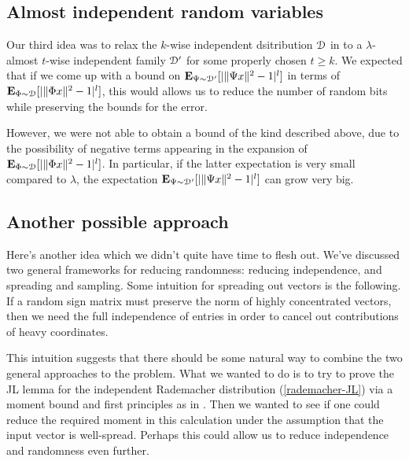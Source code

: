 \subsection{Almost independent random variables}

Our third idea was to relax the $k$-wise independent dsitribution $\mathcal{D}$
in \cite{kane-2011} to a $\lambda$-almost $t$-wise independent family
$\mathcal{D}'$ for some properly chosen $t\ge k$. We expected that if we come
up with a bound on $\operatorname*{\mathbf{E}}_{\Psi \sim \mathcal{D}'}[|\|\Psi x\|^2-1|^l]$ in terms
of $\operatorname*{\mathbf{E}}_{\Phi \sim \mathcal{D}}[|\|\Phi x\|^2-1|^l]$, this would allows us to
reduce the number of random bits while preserving the bounds for the
error.

However, we were not able to obtain a bound of the kind described
above, due to the possibility of negative terms appearing in the
expansion of $\operatorname*{\mathbf{E}}_{\Phi \sim \mathcal{D}}[|\|\Phi x\|^2-1|^l]$. In particular,
if the latter expectation is very small compared to $\lambda$, the
expectation $\operatorname*{\mathbf{E}}_{\Psi \sim \mathcal{D}'}[|\|\Psi x\|^2-1|^l]$ can grow very
big.

\subsection{Another possible approach}

Here's another idea which we didn't quite have time to flesh
out. We've discussed two general frameworks for reducing randomness:
reducing independence, and spreading and sampling. Some intuition for
spreading out vectors is the following. If a random sign matrix must
preserve the norm of highly concentrated vectors, then we need the
full independence of entries in order to cancel out contributions of
heavy coordinates.

This intuition suggests that there should be some natural way to
combine the two general approaches to the problem. What we wanted to
do is to try to prove the JL lemma for the independent Rademacher
distribution (\ref{rademacher-JL}) via a moment bound and first
principles as in \cite{kane-2012}. Then we wanted to see if one could
reduce the required moment in this calculation under the assumption
that the input vector is well-spread. Perhaps this could allow us to
reduce independence and randomness even further.






